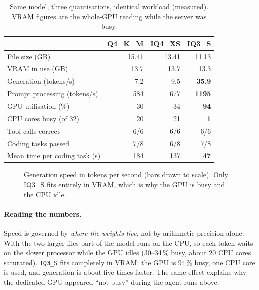 \begin{table}[t]
\centering\small
\begin{tabular}{lrrr}
\toprule & \textbf{Q4\_K\_M} & \textbf{IQ4\_XS} & \textbf{IQ3\_S}\\\midrule
File size (GB) & 15.41 & 13.41 & 11.13\\
VRAM in use (GB) & 13.7 & 13.7 & 13.3\\
Generation (tokens/s) & 7.2 & 9.5 & \textbf{35.9}\\
Prompt processing (tokens/s) & 584 & 677 & \textbf{1195}\\
GPU utilisation (\%) & 30 & 34 & \textbf{94}\\
CPU cores busy (of 32) & 20 & 21 & \textbf{1}\\
Tool calls correct & 6/6 & 6/6 & 6/6\\
Coding tasks passed & 7/8 & 6/8 & 7/8\\
Mean time per coding task (s) & 184 & 137 & \textbf{47}\\\bottomrule
\end{tabular}
\caption{Same model, three quantisations, identical workload (measured). VRAM figures are the whole-GPU reading while the server was busy.}\label{tab:quant}
\end{table}

\begin{figure}[t]
\centering
{}
\caption{Generation speed in tokens per second (bars drawn to scale). Only IQ3\_S fits entirely in VRAM, which is why the GPU is busy and the CPU idle.}\label{fig:speed}
\end{figure}

\paragraph{Reading the numbers.} Speed is governed by \emph{where the weights live}, not by arithmetic precision alone. With the two larger files part of the model runs on the CPU, so each token waits on the slower processor while the GPU idles (30--34\,\% busy, about 20 CPU cores saturated). \texttt{IQ3\_S} fits completely in VRAM: the GPU is 94\,\% busy, one CPU core is used, and generation is about five times faster. The same effect explains why the dedicated GPU appeared ``not busy'' during the agent runs above.

